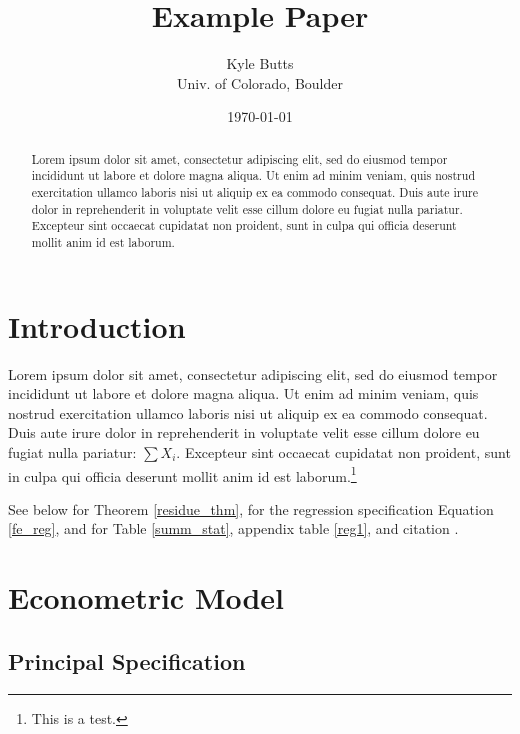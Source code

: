 \documentclass[11pt]{article}
\title{\color{navyblue} Example Paper}
\author{\normalsize Kyle Butts\\{\footnotesize Univ. of Colorado, Boulder}}
\date{\footnotesize\today}
\begin{document}
\maketitle
\begin{abstract}
    Lorem ipsum dolor sit amet, consectetur adipiscing elit, sed do eiusmod tempor incididunt ut labore et dolore magna aliqua. Ut enim ad minim veniam, quis nostrud exercitation ullamco laboris nisi ut aliquip ex ea commodo consequat. Duis aute irure dolor in reprehenderit in voluptate velit esse cillum dolore eu fugiat nulla pariatur. Excepteur sint occaecat cupidatat non proident, sunt in culpa qui officia deserunt mollit anim id est laborum.
\end{abstract}

\newpage



\section{Introduction}

Lorem ipsum dolor sit amet, consectetur adipiscing elit, sed do eiusmod tempor incididunt ut labore et dolore magna aliqua. Ut enim ad minim veniam, quis nostrud exercitation ullamco laboris nisi ut aliquip ex ea commodo consequat. Duis aute irure dolor in reprehenderit in voluptate velit esse cillum dolore eu fugiat nulla pariatur: $\sum X_i$. Excepteur sint occaecat cupidatat non proident, sunt in culpa qui officia deserunt mollit anim id est laborum.\footnote{This is a test.}

See below for Theorem \ref{residue_thm}, for the regression specification Equation \ref{fe_reg}, and for Table \ref{summ_stat}, appendix table \ref{reg1}, and citation \citet{Eigen1971}.

\section{Econometric Model}

\subsection{Principal Specification}
\end{document}

